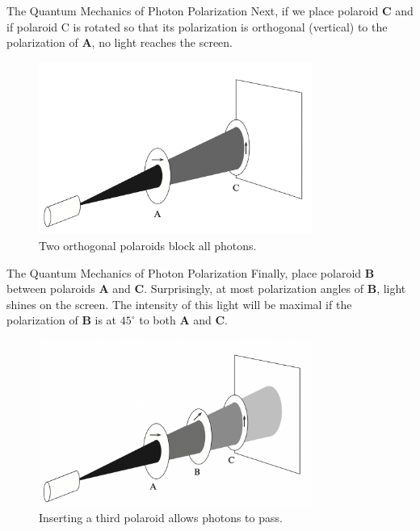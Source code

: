 \documentclass[10pt]{beamer}
\begin{document}
\begin{frame}[fragile]{The Quantum Mechanics of Photon Polarization}
    Next, if we place polaroid \textbf{C} and if polaroid C is rotated so that its polarization is orthogonal (vertical) to the polarization of \textbf{A}, no light reaches the screen.
    \begin{figure}[htbp]
          \centering
          \includegraphics[width=0.8\textwidth]{hv.png}
          \caption{Two orthogonal polaroids block all photons.}
    \end{figure}
    
\end{frame}

\begin{frame}[fragile]{The Quantum Mechanics of Photon Polarization}
    Finally, place polaroid \textbf{B} between polaroids \textbf{A} and \textbf{C}. Surprisingly, at most polarization angles of \textbf{B}, light shines on the screen. The intensity of this light will be maximal if the polarization of \textbf{B} is at $45^{\circ}$ to both \textbf{A} and \textbf{C}.
    \begin{figure}[htbp]
          \centering
          \includegraphics[width=0.8\textwidth]{hdv.png}
          \caption{Inserting a third polaroid allows photons to pass.}
    \end{figure}
\end{frame}
\end{document}

